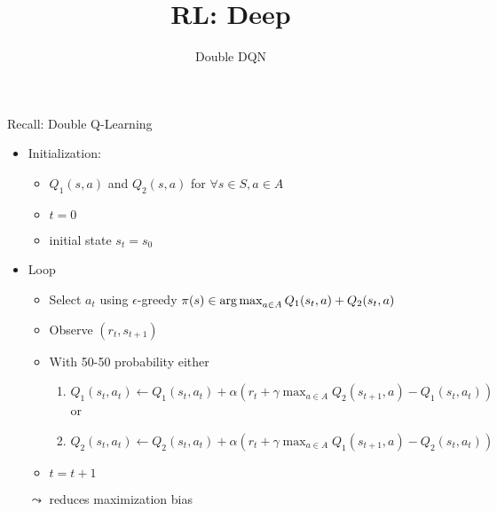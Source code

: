 \documentclass[aspectratio=169]{../latex_main/tntbeamer}  %
\title[RL: Deep Reinforcement Learning]{RL: Deep}
\subtitle{Double DQN}
\begin{document}
	
	\maketitle

\begin{frame}[c]{Recall: Double Q-Learning}
	
	\begin{itemize}
		\item Initialization:
		\begin{itemize}
			\item $Q_1(s,a)$ and $Q_2(s,a)$ for $\forall s \in S, a\in A$
			\item $t= 0$
			\item initial state $s_t = s_0$
		\end{itemize}
		\item Loop
		\begin{itemize}
			\item Select $a_t$ using $\epsilon$-greedy $\pi(s) \in \operatorname*{arg\,max}_{a \in A} Q_1(s_t, a) + Q_2(s_t , a)$
			\item Observe $(r_t, s_{t+1})$
			\item With 50-50 probability either
			\begin{enumerate}
				\item $Q_1(s_t, a_t) \gets Q_1(s_t, a_t) + \alpha (r_t +\gamma \max_{a\in A} Q_2(s_{t+1}, a) - Q_1(s_t, a_t))$\\
				or
				\item $Q_2(s_t, a_t) \gets Q_2(s_t, a_t) + \alpha (r_t +\gamma \max_{a\in A} Q_1(s_{t+1}, a) - Q_2(s_t, a_t))$
			\end{enumerate}
			\item $t = t + 1 $
		\end{itemize}
	
		\bigskip
		\pause
		\item[$\leadsto$] reduces maximization bias
	\end{itemize}
	
\end{frame}
\end{document}
